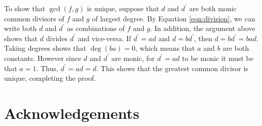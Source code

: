 \documentclass[11pt, oneside]{article}   	%
\theoremstyle{definition}
\begin{document}
\bigskip
\noindent
To show that $\gcd(f,g)$ is unique, suppose that $d$ and $d^\prime$ are both monic common divisors of $f$ and 
$g$ of largest degree.  By Equation \ref{eqn:division}, we can write both $d$ and $d^\prime$ as combinations of $f$ and $g$. In addition, the argument above shows that 
$d$ divides $d^\prime$ and vice-versa. If $d^\prime = ad$ and $d = bd^\prime$, then $d = bd^\prime = bad$. Taking degrees shows that $\deg(ba) = 0$, which means 
that $a$ and $b$ are both constants. However since $d$ and $d^\prime$ are monic, for $d^\prime = ad$ to be monic it must be that $a = 1$. Thus, $d^\prime = ad = d$. 
This shows that the greatest common divisor is unique, completing the proof.


\bigskip
\section{Acknowledgements}

\newpage


\end{document}
